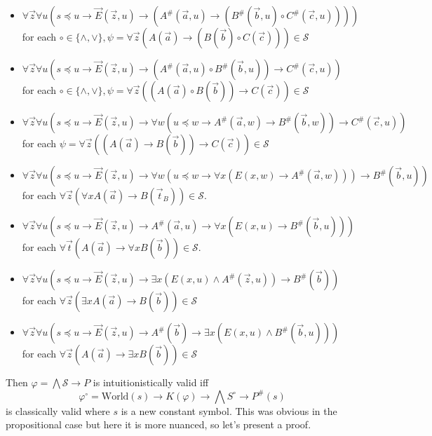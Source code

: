 \documentclass[a4paper,UKenglish,cleveref, autoref, thm-restate]{lipics-v2021}
\begin{document}
\begin{itemize}
	\item $\forall \vec z\forall u(s\preceq u\to \vec E(\vec z, u)\to (A^\#(\vec a, u)\to (B^\#(\vec b, u)\circ C^\#(\vec c, u))))$\\for each $\circ\in\{\wedge, \vee\}, \psi = \forall \vec z(A(\vec a)\to (B(\vec b)\circ C(\vec c)))\in\mathcal S$
	\item $\forall \vec z\forall u(s\preceq u\to\vec E(\vec z, u)\to (A^\#(\vec a, u)\circ B^\#(\vec b, u))\to C^\#(\vec c, u))$\\for each $\circ\in\{\wedge, \vee\}, \psi = \forall \vec z((A(\vec a)\circ B(\vec b))\to C(\vec c))\in\mathcal S$
	\item $\forall \vec z\forall u(s\preceq u\to\vec E(\vec z, u)\to\forall w(u\preceq w\to A^\#(\vec a, w)\to B^\#(\vec b, w))\to C^\#(\vec c, u))$\\ for each $\psi = \forall \vec z((A(\vec a)\to B(\vec b))\to C(\vec c))\in\mathcal S$
	\item  $\forall \vec z\forall u(s\preceq u\to\vec E(\vec z, u)\to \forall w(u\preceq w\to \forall x(E(x, w)\to A^\#(\vec a, w)))\to B^\#(\vec b, u))$\\for each $\forall \vec z(\forall xA(\vec a)\to B(\vec t_B))\in\mathcal S$.
	\item $\forall \vec z\forall u(s\preceq u\to\vec E(\vec z, u)\to A^\#(\vec a, u)\to \forall x(E(x, u)\to B^\#(\vec b, u)))$\\for each $\forall \vec t(A(\vec a)\to \forall xB(\vec b))\in\mathcal S$.
	\item $\forall \vec z\forall u(s\preceq u\to\vec E(\vec z, u)\to \exists x(E(x, u)\wedge A^\#(\vec z, u))\to B^\#(\vec b))$\\for each $\forall \vec z(\exists xA(\vec a)\to B(\vec b))\in\mathcal S$
	\item $\forall \vec z\forall u(s\preceq u\to\vec E(\vec z, u)\to A^\#(\vec b)\to \exists x(E(x, u)\wedge B^\#(\vec b, u)))$\\for each $\forall \vec z(A(\vec a)\to \exists xB(\vec b))\in\mathcal S$
\end{itemize}

Then $\varphi = \bigwedge\mathcal S\to P$ is intuitionistically valid iff
$$\varphi^\circ= \text{World}(s)\to K(\varphi)\to \bigwedge S^\circ\to P^\#(s)$$
is classically valid where $s$ is a new constant symbol. This was obvious in the propositional case but here it is more nuanced, so let's present a proof.
\end{document}
